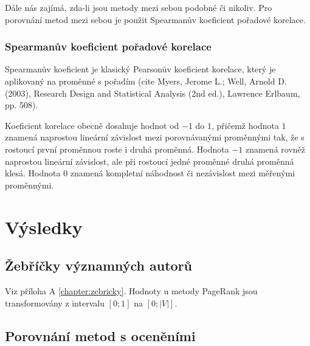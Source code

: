 \documentclass[12pt,titlepage]{report}
\begin{document}
Dále nás zajímá, zda-li jsou metody mezi sebou podobné či nikoliv. Pro
porovnání metod mezi sebou je použit Spearmanův koeficient pořadové korelace.

\subsection{Spearmanův koeficient pořadové korelace}
Spearmanův koeficient je klasický Pearsonův koeficient korelace, který je
aplikovaný na proměnné s pořadím (cite Myers, Jerome L.; Well, Arnold D.
(2003), Research Design and Statistical Analysis (2nd ed.), Lawrence Erlbaum,
pp. 508).

Koeficient korelace obecně dosahuje hodnot od $-1$ do $1$, přičemž hodnota $1$
znamená naprostou lineární závislost mezi porovnávanými proměnnými tak, že s
rostoucí první proměnnou roste i druhá proměnná. Hodnota $-1$ znamená rovněž
naprostou lineární závislost, ale při rostoucí jedné proměnné druhá proměnná
klesá. Hodnota $0$ znamená kompletní náhodnost či nezávislost mezi měřenými
proměnnými.








\chapter{Výsledky}
\section{Žebříčky významných autorů}
Viz příloha A \ref{chapter:zebricky}. Hodnoty u metody PageRank jsou
transformovány z intervalu $[0; 1]$ na $[0; |V|]$.
\section{Porovnání metod s oceněními}
\end{document}
